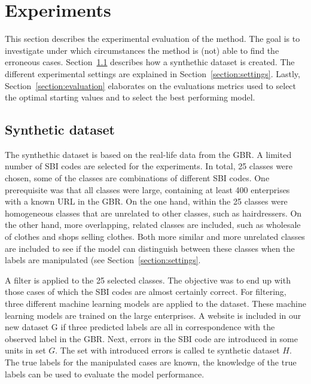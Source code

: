 \documentclass[12pt, a4paper, titlepage]{article}
\begin{document}
							\section{Experiments}
							\label{section:experiments}

This section describes the experimental evaluation of the method. The goal is to investigate under which circumstances the method is (not) able to find the erroneous cases. Section~\ref{section:synthdata} describes how a synthethic dataset is created. The different experimental settings are explained in Section~\ref{section:settings}. Lastly, Section~\ref{section:evaluation} elaborates on the evaluations metrics used to select the optimal starting values and to select the best performing model.

					\subsection{Synthetic dataset}
					\label{section:synthdata}
The synthethic dataset is based on the real-life data from the GBR. A limited number of SBI codes are selected for the experiments. In total, 25 classes were chosen, some of the classes are combinations of different SBI codes. One prerequisite was that all classes were large, containing at least 400 enterprises with a known URL in the GBR. On the one hand, within the 25 classes were homogeneous classes that are unrelated to other classes, such as hairdressers. On the other hand, more overlapping, related classes are included, such as wholesale of clothes and shops selling clothes. Both more similar and more unrelated classes are included to see if the model can distinguish between these classes when the labels are manipulated (see Section~\ref{section:settings}.

A filter is applied to the 25 selected classes. The objective was to end up with those cases of which the SBI codes are almost certainly correct. For filtering, three different machine learning models are applied to the dataset. These machine learning models are trained on the large enterprises. A website is included in our new dataset G if three predicted labels are all in correspondence with the observed label in the GBR. Next, errors in the SBI code are introduced in some units in set $G$. The set with introduced errors is called te synthetic dataset $H$. The true labels for the manipulated cases are known, the knowledge of the true labels can be used to evaluate the model performance.
\end{document}
